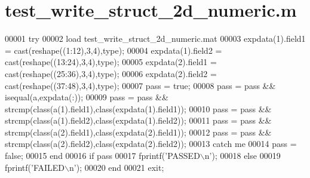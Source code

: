 \hypertarget{test__write__struct__2d__numeric_8m_source}{}\section{test\+\_\+write\+\_\+struct\+\_\+2d\+\_\+numeric.\+m}
\label{test__write__struct__2d__numeric_8m_source}

\begin{DoxyCode}
00001 \textcolor{keywordflow}{try}
00002     load test\_write\_struct\_2d\_numeric.mat
00003     expdata(1).field1 = cast(reshape((1:12),3,4),type);
00004     expdata(1).field2 = cast(reshape((13:24),3,4),type);
00005     expdata(2).field1 = cast(reshape((25:36),3,4),type);
00006     expdata(2).field2 = cast(reshape((37:48),3,4),type);
00007     pass = \textcolor{keyword}{true};
00008     pass = pass && isequal(a,expdata(:));
00009     pass = pass && strcmp(\textcolor{keyword}{class}(a(1).field1),\textcolor{keyword}{class}(expdata(1).field1));
00010     pass = pass && strcmp(\textcolor{keyword}{class}(a(1).field2),\textcolor{keyword}{class}(expdata(1).field2));
00011     pass = pass && strcmp(\textcolor{keyword}{class}(a(2).field1),\textcolor{keyword}{class}(expdata(2).field1));
00012     pass = pass && strcmp(\textcolor{keyword}{class}(a(2).field2),\textcolor{keyword}{class}(expdata(2).field2));
00013 \textcolor{keywordflow}{catch} me
00014     pass = \textcolor{keyword}{false};
00015 end
00016 \textcolor{keywordflow}{if} pass
00017     fprintf(\textcolor{stringliteral}{'PASSED\(\backslash\)n'});
00018 \textcolor{keywordflow}{else}
00019     fprintf(\textcolor{stringliteral}{'FAILED\(\backslash\)n'});
00020 end
00021 exit;
\end{DoxyCode}
